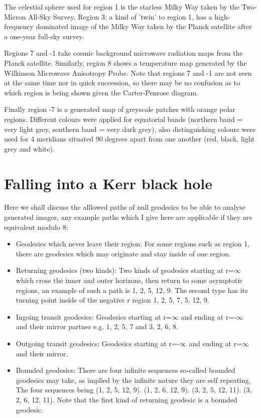 \documentclass[oneside,openright,frontopenright, singlespacing]{dmathesis}
\begin{document}
\vspace{1em}
	The celestial sphere used for region 1 is the starless Milky Way taken by the Two-Micron All-Sky Survey\cite{skrutskie2006two}. Region 3; a kind of 'twin' to region 1, has a high-frequency dominated image of the Milky Way taken by the Planck satellite after a one-year full-sky survey\cite{planck2011astronomy}.

\vspace{1em}
	Regions 7 and -1 take cosmic background microwave radiation maps from the Planck satellite\cite{adam2016planck}. Similarly, region 8 shows a temperature map generated by the Wilkinson Microwave Anisotropy Probe\cite{bennet2013wmap}. Note that regions 7 and -1 are not seen at the same time nor in quick succession, so there may be no confusion as to which region is being shown given the Carter-Penrose diagram.

\vspace{1em}
	Finally region -7 is a generated map of greyscale patches with orange polar regions. Different colours were applied for equatorial bands (northern band = very light grey, southern band = very dark grey), also distinguishing colours were used for 4 meridians situated 90 degrees apart from one another (red, black, light grey and white).

\section{Falling into a Kerr black hole}\label{sec:Section6.2}

\vspace{1em}
	Here we shall discuss the alllowed paths of null geodesics to be able to analyse generated images, any example paths which I give here are applicable if they are equivalent modulo 8:

\vspace{1em}
\begin{itemize}
  \item Geodesics which never leave their region: For some regions such as region 1, there are geodesics which may originate and stay inside of one region.
  \item Returning geodesics (two kinds): Two kinds of geodesics starting at r=$\infty$ which cross the inner and outer horizons, then return to some asymptotic regions, an example of such a path is 1, 2, 5, 12, 9. The second type has its turning point inside of the negative r region 1, 2, 5, 7, 5, 12, 9.
  \item Ingoing transit geodesics: Geodesics starting at r=$\infty$ and ending at r=-$\infty$ and their mirror partner e.g. 1, 2, 5, 7 and 3, 2, 6, 8.
  \item Outgoing transit geodesics: Geodesics starting at r=-$\infty$ and ending at r=$\infty$ and their mirror.
  \item Bounded geodesics: There are four infinite sequences so-called bounded geodesics may take, as implied by the infinite nature they are self repeating, The four sequences being (1, 2, 5, 12, 9). (1, 2, 6, 12, 9). (3, 2, 5, 12, 11). (3, 2, 6, 12, 11). Note that the first kind of returning geodesic is a bounded geodesic.
\end{itemize}
\end{document}
